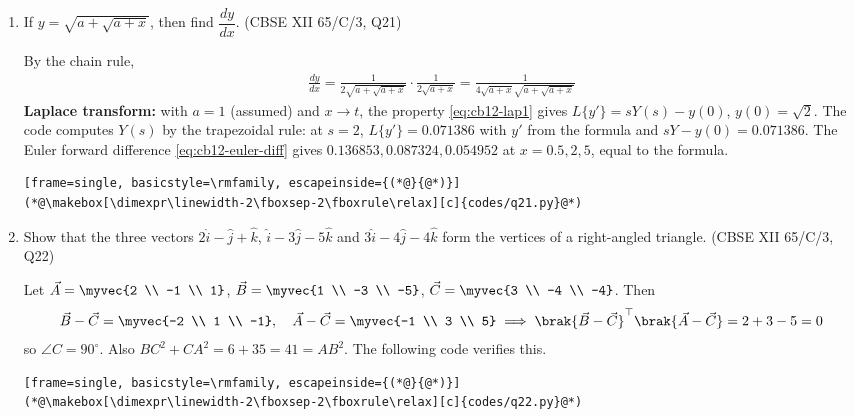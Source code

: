 \begin{enumerate}[label=\thesubsection.\arabic*, ref=\thesubsection.\theenumi,itemsep=0pt]
\item If $y = \sqrt{a + \sqrt{a + x}}$, then find $\dfrac{dy}{dx}$.
\hfill (CBSE XII 65/C/3, Q21)

\solution By the chain rule,
\begin{align}
\frac{dy}{dx} = \frac{1}{2\sqrt{a+\sqrt{a+x}}}\cdot\frac{1}{2\sqrt{a+x}} = \frac{1}{4\sqrt{a+x}\sqrt{a+\sqrt{a+x}}}
\end{align}
\textbf{Laplace transform:} with $a = 1$ (assumed) and $x \to t$, the property \eqref{eq:cb12-lap1} gives $L\{y'\} = sY(s) - y(0)$, $y(0) = \sqrt{2}$. The code computes $Y(s)$ by the trapezoidal rule: at $s = 2$, $L\{y'\} = 0.071386$ with $y'$ from the formula and $sY - y(0) = 0.071386$. The Euler forward difference \eqref{eq:cb12-euler-diff} gives $0.136853, 0.087324, 0.054952$ at $x = 0.5, 2, 5$, equal to the formula.
\begin{lstlisting}[frame=single, basicstyle=\rmfamily, escapeinside={(*@}{@*)}]
(*@\makebox[\dimexpr\linewidth-2\fboxsep-2\fboxrule\relax][c]{codes/q21.py}@*)
\end{lstlisting}

\item Show that the three vectors $2\hat{i} - \hat{j} + \hat{k}$, $\hat{i} - 3\hat{j} - 5\hat{k}$ and $3\hat{i} - 4\hat{j} - 4\hat{k}$ form the vertices of a right-angled triangle.
\hfill (CBSE XII 65/C/3, Q22)

\solution Let $\vec{A} = \myvec{2 \\ -1 \\ 1}$, $\vec{B} = \myvec{1 \\ -3 \\ -5}$, $\vec{C} = \myvec{3 \\ -4 \\ -4}$. Then
\begin{align}
\vec{B}-\vec{C} = \myvec{-2 \\ 1 \\ -1}, \quad \vec{A}-\vec{C} = \myvec{-1 \\ 3 \\ 5}
\implies \brak{\vec{B}-\vec{C}}^{\top}\brak{\vec{A}-\vec{C}} = 2 + 3 - 5 = 0
\end{align}
so $\angle C = 90^\circ$. Also $BC^2 + CA^2 = 6 + 35 = 41 = AB^2$. The following code verifies this.
\begin{lstlisting}[frame=single, basicstyle=\rmfamily, escapeinside={(*@}{@*)}]
(*@\makebox[\dimexpr\linewidth-2\fboxsep-2\fboxrule\relax][c]{codes/q22.py}@*)
\end{lstlisting}


\end{enumerate}
